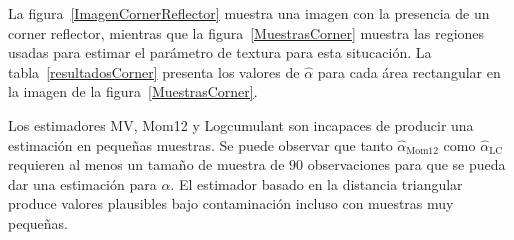 
La figura~\ref{ImagenCornerReflector} muestra una imagen con la presencia de un corner reflector, mientras que la figura~\ref{MuestrasCorner} muestra las regiones usadas para estimar el parámetro de textura para esta situcación. La tabla~\ref{resultadosCorner} presenta los valores de  $\widehat{\alpha}$ para cada área rectangular en la imagen de la figura~\ref{MuestrasCorner}.

Los estimadores MV, Mom12 y  Logcumulant son incapaces de producir una estimación en pequeñas muestras.  Se puede observar que tanto $\widehat\alpha_{\text{Mom12}}$ como $\widehat\alpha_{\text{LC}}$ requieren al menos un tamaño de muestra de $90$ observaciones para que se pueda dar una estimación para $\alpha$. El estimador basado en la distancia triangular produce valores plausibles bajo contaminación incluso con muestras muy pequeñas.

